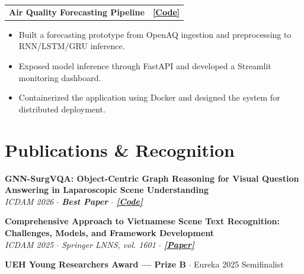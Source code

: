 \documentclass[a4paper,10pt]{article}
\makeatletter
\newcommand{\cvitem}{\itemsep0.55mm\parskip0pt\parsep0pt}
\newcommand{\bulletliststart}{\begin{itemize}[leftmargin=4.2mm,label=\raisebox{0.2ex}{\tiny$\bullet$},topsep=1.1mm] \cvitem}
\newcommand{\bulletlistend}{\end{itemize}\vspace{0.45mm}}
\newcommand{\project}[2]{%
  \par\noindent
  \begin{tabularx}{\textwidth}{@{}Xr@{}}
    \textbf{#1} & #2
  \end{tabularx}
  \par\vspace{0.35mm}
}
\newcommand{\publication}[2]{%
  \par\noindent
  \textbf{#1}\\[-0.1mm]
  \textit{#2}
  \par
}
\makeatother
\begin{document}
\project
  {Air Quality Forecasting Pipeline}
  {\href{https://github.com/nmhongtram/air-quality-forecasting}{\textbf{[Code]}}}
\bulletliststart
  \item Built a forecasting prototype from OpenAQ ingestion and preprocessing to RNN/LSTM/GRU inference.
  \item Exposed model inference through FastAPI and developed a Streamlit monitoring dashboard.
  \item Containerized the application using Docker and designed the system for distributed deployment.
\bulletlistend

\section{Publications \& Recognition}
\vspace{1.2mm}
\publication
  {GNN-SurgVQA: Object-Centric Graph Reasoning for Visual Question Answering in Laparoscopic Scene Understanding}
  {ICDAM 2026 $\cdot$ \textbf{Best Paper} $\cdot$ \href{https://github.com/nmhongtram/gnn-surgical-understanding}{\textup{\textbf{[Code]}}}}

\vspace{1.8mm}
\publication
  {Comprehensive Approach to Vietnamese Scene Text Recognition: Challenges, Models, and Framework Development}
  {ICDAM 2025 $\cdot$ Springer LNNS, vol. 1601 $\cdot$ \href{https://link.springer.com/chapter/10.1007/978-3-032-03527-1_3}{\textup{\textbf{[Paper]}}}}

\par\vspace{2.2mm}
\noindent\textbf{UEH Young Researchers Award --- Prize B} $\cdot$ Eureka 2025 Semifinalist\par
\end{document}

